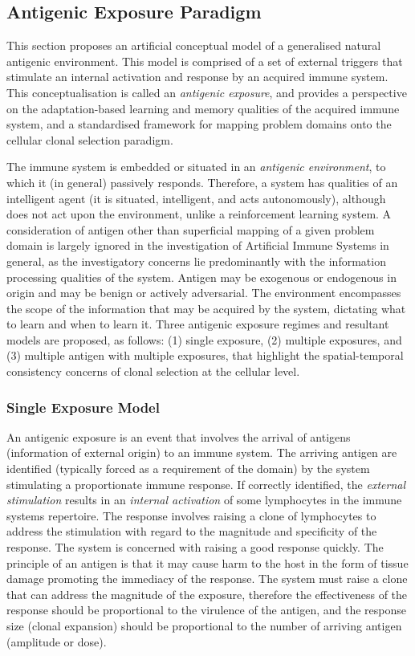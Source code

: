 %
%
\subsection{Antigenic Exposure Paradigm}
\label{subsec:cells:paradigm:antigenicexposures}
This section proposes an artificial conceptual model of a generalised natural antigenic environment. This model is comprised of a set of external triggers that stimulate an internal activation and response by an acquired immune system. This conceptualisation is called an \emph{antigenic exposure}, and provides a perspective on the adaptation-based learning and memory qualities of the acquired immune system, and a standardised framework for mapping problem domains onto the cellular clonal selection paradigm. 

The immune system is embedded or situated in an \emph{antigenic environment}, to which it (in general) passively responds. Therefore, a system has qualities of an intelligent agent (it is situated, intelligent, and acts autonomously), although does not act upon the environment, unlike a reinforcement learning system. A consideration of antigen other than superficial mapping of a given problem domain is largely ignored in the investigation of Artificial Immune Systems in general, as the investigatory concerns lie predominantly with the information processing qualities of the system. Antigen may be exogenous or endogenous in origin and may be benign or actively adversarial. The environment encompasses the scope of the information that may be acquired by the system, dictating what to learn and when to learn it. Three antigenic exposure regimes and resultant models are proposed, as follows: (1) single exposure, (2) multiple exposures, and (3) multiple antigen with multiple exposures, that highlight the spatial-temporal consistency concerns of clonal selection at the cellular level. 

%
%
\subsubsection{Single Exposure Model}
An antigenic exposure is an event that involves the arrival of antigens (information of external origin) to an immune system. The arriving antigen are identified (typically forced as a requirement of the domain) by the system stimulating a proportionate immune response. If correctly identified, the \emph{external stimulation} results in an \emph{internal activation} of some lymphocytes in the immune systems repertoire. The response involves raising a clone of lymphocytes to address the stimulation with regard to the magnitude and specificity of the response. The system is concerned with raising a good response quickly. The principle of an antigen is that it may cause harm to the host in the form of tissue damage promoting the immediacy of the response. The system must raise a clone that can address the magnitude of the exposure, therefore the effectiveness of the response should be proportional to the virulence of the antigen, and the response size (clonal expansion) should be proportional to the number of arriving antigen (amplitude or dose).

